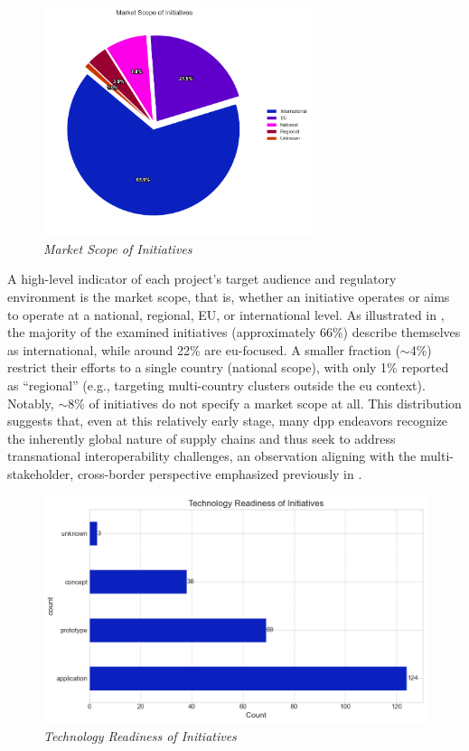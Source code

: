 \begin{figure}[htbp]
  \centering
  \includegraphics[width=0.7\textwidth]{figures/initiatives_market_scope.png}
  \caption{%
    \textit{Market Scope of Initiatives} 
  }
  \label{fig:initiatives_market_scope}
\end{figure}

A high-level indicator of each project’s target audience and regulatory environment is the market scope, that is, whether an initiative operates or aims to operate at a national, regional, EU, or international level. As illustrated in , the majority of the examined initiatives (approximately 66\%) describe themselves as international, while around 22\% are \ac{eu}-focused. A smaller fraction ($\sim$4\%) restrict their efforts to a single country (national scope), with only 1\% reported as “regional” (e.g., targeting multi-country clusters outside the \ac{eu} context). Notably, $\sim$8\% of initiatives do not specify a market scope at all. This distribution suggests that, even at this relatively early stage, many \ac{dpp} endeavors recognize the inherently global nature of supply chains and thus seek to address transnational interoperability challenges, an observation aligning with the multi-stakeholder, cross-border perspective emphasized previously in .

\begin{figure}[htbp]
  \centering
  \includegraphics[width=\textwidth]{figures/initiatives_tech_readiness.png}
  \caption{%
    \textit{Technology Readiness of Initiatives} 
  }
  \label{fig:initiatives_tech_readiness}
\end{figure}


